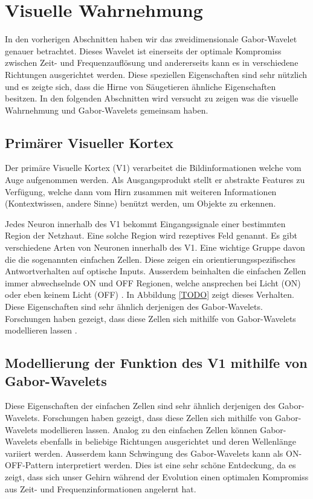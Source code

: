 \section{Visuelle Wahrnehmung}

In den vorherigen Abschnitten haben wir das zweidimensionale Gabor-Wavelet genauer betrachtet.
Dieses Wavelet ist einerseits der optimale Kompromiss zwischen Zeit- und Frequenzauflösung und andererseits kann es in verschiedene Richtungen ausgerichtet werden.
Diese speziellen Eigenschaften sind sehr nützlich und es zeigte sich, dass die Hirne von Säugetieren ähnliche Eigenschaften besitzen.
In den folgenden Abschnitten wird versucht zu zeigen was die visuelle Wahrnehmung und Gabor-Wavelets gemeinsam haben. 

\subsection{Primärer Visueller Kortex}

Der primäre Visuelle Kortex (V1) verarbeitet die Bildinformationen welche vom Auge aufgenommen werden.
Als Ausgangsprodukt stellt er abstrakte Features zu Verfügung, welche dann vom Hirn zusammen mit weiteren Informationen (Kontextwissen, andere Sinne)  benützt werden, um Objekte zu erkennen.

Jedes Neuron innerhalb des V1 bekommt Eingangssignale einer bestimmten Region der Netzhaut.
Eine solche Region wird rezeptives Feld genannt.
Es gibt verschiedene Arten von Neuronen innerhalb des V1.
Eine wichtige Gruppe davon die die sogenannten einfachen Zellen.
Diese zeigen ein orientierungsspezifisches Antwortverhalten auf optische Inputs.
Ausserdem beinhalten die einfachen Zellen immer abwechselnde ON und OFF Regionen, welche ansprechen bei Licht (ON) oder eben keinem Licht (OFF) \cite{book:neuroscience}.
In Abbildung \ref{TODO} zeigt dieses Verhalten. %
Diese Eigenschaften sind sehr ähnlich derjenigen des Gabor-Wavelets.
Forschungen haben gezeigt, dass diese Zellen sich mithilfe von Gabor-Wavelets modellieren lassen \cite{paper:imgrep}.


\subsection{Modellierung der Funktion des V1 mithilfe von Gabor-Wavelets}

Diese Eigenschaften der einfachen Zellen sind sehr ähnlich derjenigen des Gabor-Wavelets.
Forschungen haben gezeigt, dass diese Zellen sich mithilfe von Gabor-Wavelets modellieren lassen.
Analog zu den einfachen Zellen können Gabor-Wavelets ebenfalls in beliebige Richtungen ausgerichtet und deren Wellenlänge variiert werden.
Ausserdem kann Schwingung des Gabor-Wavelets kann als ON-OFF-Pattern interpretiert werden.
Dies ist eine sehr schöne Entdeckung, da es zeigt, dass sich unser Gehirn während der Evolution einen optimalen Kompromiss aus Zeit- und Frequenzinformationen angelernt hat.
